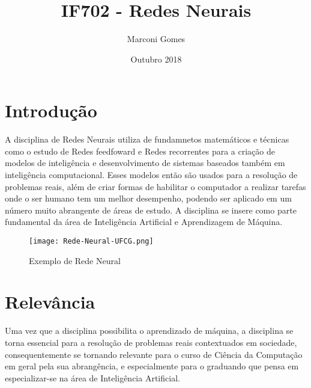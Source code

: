 \documentclass[10pt]{article}
\title{IF702 - Redes Neurais}
\author{Marconi Gomes}
\date{Outubro 2018}
\begin{document}
\maketitle


\section{Introdução}
A disciplina de Redes Neurais utiliza de fundamnetos matemáticos e técnicas como o estudo de Redes feedfoward e Redes recorrentes para a criação de modelos de inteligência e desenvolvimento de sistemas baseados também em inteligência computacional. Esses modelos então são usados para a resolução de problemas reais, além de criar formas de habilitar o computador a realizar tarefas onde o ser humano tem um melhor desempenho, podendo ser aplicado em um número muito abrangente de áreas de estudo. A disciplina se insere como parte fundamental da área de Inteligência Artificial e Aprendizagem de Máquina. \cite{cin}

\begin{figure}[h!]
\centering
\texttt{[image: Rede-Neural-UFCG.png]}
\caption{Exemplo de Rede Neural \cite{ufcg}}
\label{fig:Rede-Neural-UFCG}
\end{figure}

\section{Relevância}
  Uma vez que a disciplina possibilita o aprendizado de máquina, a disciplina se torna essencial para a resolução de problemas reais contextuados em sociedade, consequentemente se tornando relevante para o curso de Ciência da Computação em geral pela sua abrangência, e especialmente para o graduando que pensa em especializar-se na área de Inteligência Artificial.\cite{gcv}

\newpage
\end{document}
